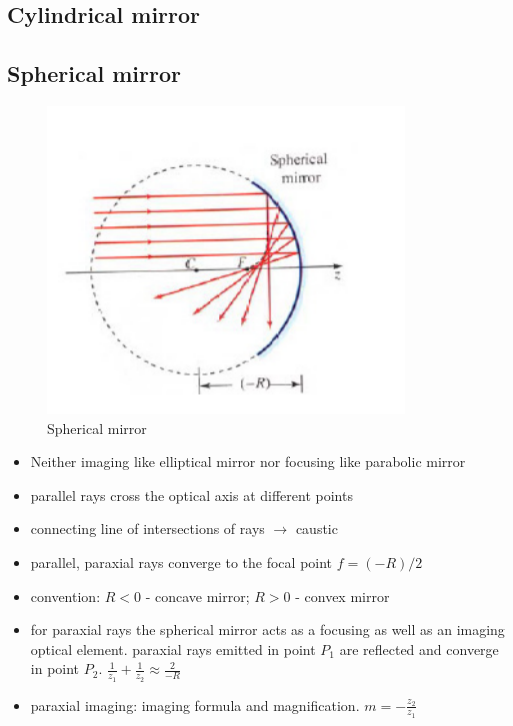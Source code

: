 \documentclass[../main.tex]{subfiles}
\begin{document}
	\subsection{Cylindrical mirror}
	\subsection{Spherical mirror}
	\begin{figure}[h!]
	  \centering
	  \includegraphics[scale=0.7]{../graphics/Optical_components4.png}
	  \caption{Spherical mirror}
	  \label{fig:mirror4}
	\end{figure}
	\begin{itemize}  
	\item Neither imaging like elliptical mirror nor focusing like parabolic mirror
	\item parallel rays cross the optical axis at different points
	\item connecting line of intersections of rays $\to$ caustic
	\item parallel, paraxial rays converge to the focal point $f = (-R)/2$
	\item convention: $R < 0$ - concave mirror; $R > 0$ - convex mirror
	\item for paraxial rays the spherical mirror acts as a focusing as well as an imaging optical element. paraxial rays emitted in point $P_1$ are reflected and converge in point $P_2$. $\frac{1}{z_1}+\frac{1}{z_2}\approx\frac{2}{-R}$
	\item paraxial imaging: imaging formula and magnification. $m=-\frac{z_2}{z_1}$
	\end{itemize}
\end{document}
